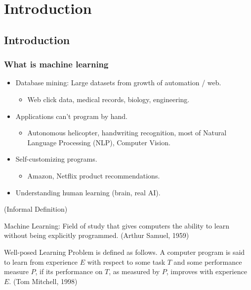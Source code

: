 
\chapter{Introduction} %

\label{ch:introduction} %

\section{Introduction}
\subsection{What is machine learning}
\begin{example}
\quad
\begin{itemize}
  \item Database mining: Large datasets from growth of automation / web.
      \begin{itemize}
        \item \Eg Web click data, medical records, biology, engineering.
      \end{itemize}
  \item Applications can't program by hand.
      \begin{itemize}
        \item \Eg Autonomous helicopter, handwriting recognition, most of Natural Language Processing (NLP), Computer Vision.
      \end{itemize}
  \item Self-customizing programs.
        \begin{itemize}
          \item \Eg Amazon, Netflix product recommendations.
        \end{itemize}
  \item Understanding human learning (brain, real AI).
\end{itemize}
\end{example}

\begin{definition}(Informal Definition)

Machine Learning: Field of study that gives computers the ability to learn without being explicitly programmed. (Arthur Samuel, 1959)
\end{definition}

\begin{definition}
\quad
Well-posed Learning Problem is defined as follows.
A computer program is said to learn from experience $E$ with respect to some task $T$ and some performance measure $P$, if its performance on $T$, as measured by $P$, improves with experience $E$. (Tom Mitchell, 1998)
\end{definition}

